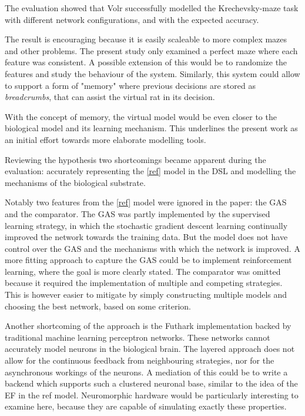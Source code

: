 \documentclass[a4paper,oneside]{memoir}
\begin{document}
The evaluation showed that Volr successfully modelled the Krechevsky-maze
task with different network configurations, and with the expected accuracy.

The result is encouraging because it is easily scaleable to more complex
mazes and other problems. The present study only examined a perfect maze where
each feature was consistent. A possible extension of this would be to randomize the
features and study the behaviour of the system. Similarly, this system could
allow to support a form of "memory" where previous decisions are stored as
\textit{breadcrumbs}, that can assist the virtual rat in its decision.

With the concept of memory, the virtual model would be even closer to the biological model
and its learning mechanism. This underlines the present work as an initial
effort towards more elaborate modelling tools.

Reviewing the hypothesis two shortcomings became apparent during the evaluation:
accurately representing the \ref{ref} model in the DSL and modelling
the mechanisms of the biological substrate.

Notably two features from the \ref{ref} model were ignored in the paper: the
GAS and the comparator. The GAS was partly implemented by the supervised
learning strategy, in which the stochastic gradient descent learning
continually improved the network towards the training data.
But the model does not have control over the GAS and the mechanisms with
which the network is improved.
A more fitting approach to capture the GAS could be to implement
reinforcement learning, where the goal is more clearly stated.
The comparator was omitted because it required the
implementation of multiple and competing strategies. This is however
easier to mitigate by simply constructing multiple models and choosing
the best network, based on some criterion.

Another shortcoming of the approach is the Futhark implementation backed
by traditional machine learning perceptron networks. These networks cannot
accurately model neurons in the biological brain. The layered approach does not allow
for the continuous feedback from neighbouring strategies, nor for the
asynchronous workings of the neurons. A mediation of this could be to
write a backend which supports such a clustered neuronal base, similar to
the idea of the EF in the \gls{ref} model. Neuromorphic hardware would be
particularly interesting to examine here, because they are capable of
simulating exactly these properties.
\end{document}
